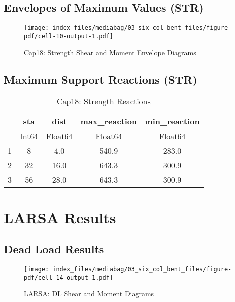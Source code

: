\documentclass[
  letterpaper,
  DIV=11,
  numbers=noendperiod]{scrreprt}
\begin{document}
\subsection{Envelopes of Maximum Values
(STR)}\label{envelopes-of-maximum-values-str-3}

\begin{figure}[H]

{\centering \texttt{[image: index\_files/mediabag/03\_six\_col\_bent\_files/figure-pdf/cell-10-output-1.pdf]}

}

\caption{Cap18: Strength Shear and Moment Envelope Diagrams}

\end{figure}%

\subsection{Maximum Support Reactions
(STR)}\label{maximum-support-reactions-str-2}

\begin{table}
\caption{Cap18: Strength Reactions}\tabularnewline

\centering
\begin{tabular}{r|cccc}
    & sta & dist & max\_reaction & min\_reaction\\
    \hline
    & Int64 & Float64 & Float64 & Float64\\
    \hline
    1 & 8 & 4.0 & 540.9 & 283.0 \\
    2 & 32 & 16.0 & 643.3 & 300.9 \\
    3 & 56 & 28.0 & 643.3 & 300.9 \\
\end{tabular}
\end{table}

\section{LARSA Results}\label{larsa-results-1}

\subsection{Dead Load Results}\label{dead-load-results-1}

\begin{figure}[H]

{\centering \texttt{[image: index\_files/mediabag/03\_six\_col\_bent\_files/figure-pdf/cell-14-output-1.pdf]}

}

\caption{LARSA: DL Shear and Moment Diagrams}

\end{figure}%
\end{document}
